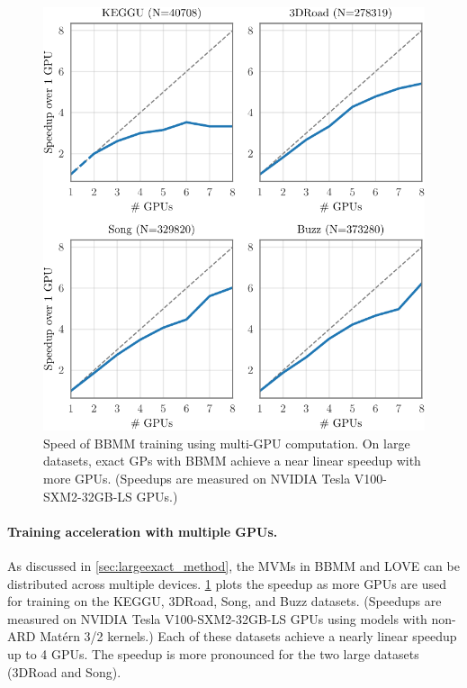 \begin{figure}[t!]
  \centering
  \includegraphics[width=0.70\linewidth]{figures/gpu_speedup.pdf}
  \caption[Speed of BBMM training using multi-GPU computation.]{
    Speed of BBMM training using multi-GPU computation.
    On large datasets, exact GPs with BBMM achieve a near linear speedup with more GPUs.
    (Speedups are measured on NVIDIA Tesla V100-SXM2-32GB-LS GPUs.)
  }
  \label{fig:gpu_speedup}
\end{figure}

\paragraph{Training acceleration with multiple GPUs.}
As discussed in \cref{sec:largeexact_method}, the MVMs in BBMM and LOVE can be distributed across multiple devices.
\cref{fig:gpu_speedup} plots the speedup as more GPUs are used for training on the KEGGU, 3DRoad, Song, and Buzz datasets.
(Speedups are measured on NVIDIA Tesla V100-SXM2-32GB-LS GPUs using models with non-ARD Mat\'ern 3/2 kernels.)
Each of these datasets achieve a nearly linear speedup up to 4 GPUs.
The speedup is more pronounced for the two large datasets (3DRoad and Song).

